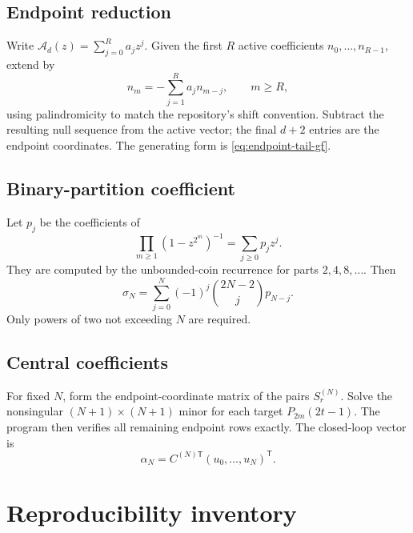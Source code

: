 \documentclass[11pt,oneside]{article}
\numberwithin{equation}{section}
\theoremstyle{definition}
\theoremstyle{remark}
\begin{document}
\subsection{Endpoint reduction}

Write $\mathcal A_d(z)=\sum_{j=0}^{R}a_jz^j$.  Given the first $R$ active
coefficients $n_0,\ldots,n_{R-1}$, extend by
\begin{equation}
 n_m=-\sum_{j=1}^{R}a_jn_{m-j},\qquad m\ge R,
 \label{eq:endpoint-forward-recurrence}
\end{equation}
using palindromicity to match the repository's shift convention.  Subtract the
resulting null sequence from the active vector; the final $d+2$ entries are the
endpoint coordinates.  The generating form is
\eqref{eq:endpoint-tail-gf}.

\subsection{Binary-partition coefficient}

Let $p_j$ be the coefficients of
\begin{equation}
 \prod_{m\ge1}(1-z^{2^m})^{-1}=\sum_{j\ge0}p_jz^j.
 \label{eq:binary-partition-gf}
\end{equation}
They are computed by the unbounded-coin recurrence for parts
$2,4,8,\ldots$.  Then
\begin{equation}
 \sigma_N=\sum_{j=0}^{N}(-1)^j\binom{2N-2}{j}p_{N-j}.
 \label{eq:sigma-convolution}
\end{equation}
Only powers of two not exceeding $N$ are required.

\subsection{Central coefficients}

For fixed $N$, form the endpoint-coordinate matrix of the pairs
$S_r^{(N)}$.  Solve the nonsingular $(N+1)\times(N+1)$ minor for each target
$P_{2m}(2t-1)$.  The program then verifies all remaining endpoint rows exactly.
The closed-loop vector is
\begin{equation}
 \alpha_N=C^{(N)\mathsf T}(u_0,\ldots,u_N)^{\mathsf T}.
 \label{eq:alpha-matrix}
\end{equation}

\section{Reproducibility inventory}
\label{app:reproducibility}
\end{document}
